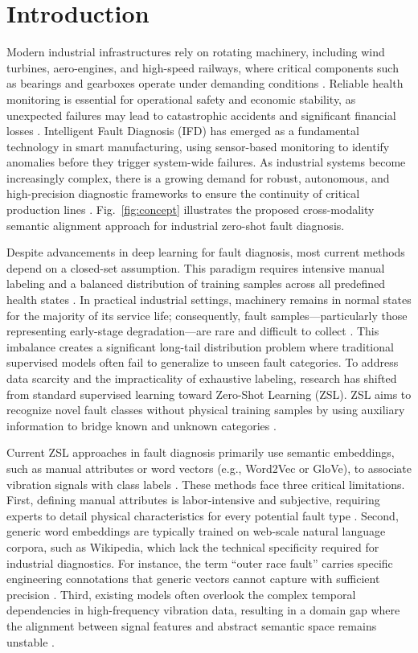 \section{Introduction}
Modern industrial infrastructures rely on rotating machinery, including wind turbines, aero-engines, and high-speed railways, where critical components such as bearings and gearboxes operate under demanding conditions \cite{zhai2021multi}. Reliable health monitoring is essential for operational safety and economic stability, as unexpected failures may lead to catastrophic accidents and significant financial losses \cite{lei2020applications}. Intelligent Fault Diagnosis (IFD) has emerged as a fundamental technology in smart manufacturing, using sensor-based monitoring to identify anomalies before they trigger system-wide failures. As industrial systems become increasingly complex, there is a growing demand for robust, autonomous, and high-precision diagnostic frameworks to ensure the continuity of critical production lines \cite{li2020deep}. Fig.~\ref{fig:concept} illustrates the proposed cross-modality semantic alignment approach for industrial zero-shot fault diagnosis.

Despite advancements in deep learning for fault diagnosis, most current methods depend on a closed-set assumption. This paradigm requires intensive manual labeling and a balanced distribution of training samples across all predefined health states \cite{zhang2022digital}. In practical industrial settings, machinery remains in normal states for the majority of its service life; consequently, fault samples---particularly those representing early-stage degradation---are rare and difficult to collect \cite{liu2018zero}. This imbalance creates a significant long-tail distribution problem where traditional supervised models often fail to generalize to unseen fault categories. To address data scarcity and the impracticality of exhaustive labeling, research has shifted from standard supervised learning toward Zero-Shot Learning (ZSL). ZSL aims to recognize novel fault classes without physical training samples by using auxiliary information to bridge known and unknown categories \cite{wang2019zero, socher2013zero}.

Current ZSL approaches in fault diagnosis primarily use semantic embeddings, such as manual attributes or word vectors (e.g., Word2Vec or GloVe), to associate vibration signals with class labels \cite{lampert2014attribute}. These methods face three critical limitations. First, defining manual attributes is labor-intensive and subjective, requiring experts to detail physical characteristics for every potential fault type \cite{fu2018zero}. Second, generic word embeddings are typically trained on web-scale natural language corpora, such as Wikipedia, which lack the technical specificity required for industrial diagnostics. For instance, the term ``outer race fault'' carries specific engineering connotations that generic vectors cannot capture with sufficient precision \cite{mikolov2013efficient}. Third, existing models often overlook the complex temporal dependencies in high-frequency vibration data, resulting in a domain gap where the alignment between signal features and abstract semantic space remains unstable \cite{xian2018zero, buchert2020zero}.

